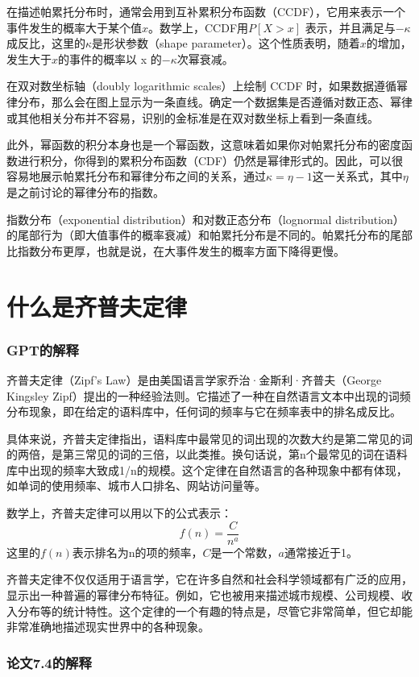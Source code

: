 在描述帕累托分布时，通常会用到互补累积分布函数（CCDF），它用来表示一个事件发生的概率大于某个值$x$。数学上，CCDF用$P[X>x]$ 表示，并且满足与$−\kappa$成反比，这里的$\kappa$是形状参数（shape parameter）。这个性质表明，随着$x$的增加，发生大于$x$的事件的概率以 x 的$−\kappa$次幂衰减。

在双对数坐标轴（doubly logarithmic scales）上绘制 CCDF 时，如果数据遵循幂律分布，那么会在图上显示为一条直线。确定一个数据集是否遵循对数正态、幂律或其他相关分布并不容易，识别的金标准是在双对数坐标上看到一条直线。

此外，幂函数的积分本身也是一个幂函数，这意味着如果你对帕累托分布的密度函数进行积分，你得到的累积分布函数（CDF）仍然是幂律形式的。因此，可以很容易地展示帕累托分布和幂律分布之间的关系，通过$\kappa = \eta −1$这一关系式，其中$\eta$是之前讨论的幂律分布的指数。

指数分布（exponential distribution）和对数正态分布（lognormal distribution）的尾部行为（即大值事件的概率衰减）和帕累托分布是不同的。帕累托分布的尾部比指数分布更厚，也就是说，在大事件发生的概率方面下降得更慢。
\section{什么是齐普夫定律}

\subsubsection{GPT的解释}

齐普夫定律（Zipf's Law）是由美国语言学家乔治·金斯利·齐普夫（George Kingsley Zipf）提出的一种经验法则。它描述了一种在自然语言文本中出现的词频分布现象，即在给定的语料库中，任何词的频率与它在频率表中的排名成反比。

具体来说，齐普夫定律指出，语料库中最常见的词出现的次数大约是第二常见的词的两倍，是第三常见的词的三倍，以此类推。换句话说，第n个最常见的词在语料库中出现的频率大致成1/n的规模。这个定律在自然语言的各种现象中都有体现，如单词的使用频率、城市人口排名、网站访问量等。

数学上，齐普夫定律可以用以下的公式表示：
\[f(n) = \frac{C}{n^a}\]
这里的$f(n)$表示排名为n的项的频率，$C$是一个常数，$a$通常接近于1。

齐普夫定律不仅仅适用于语言学，它在许多自然和社会科学领域都有广泛的应用，显示出一种普遍的幂律分布特征。例如，它也被用来描述城市规模、公司规模、收入分布等的统计特性。这个定律的一个有趣的特点是，尽管它非常简单，但它却能非常准确地描述现实世界中的各种现象。

\subsubsection{论文7.4的解释}

